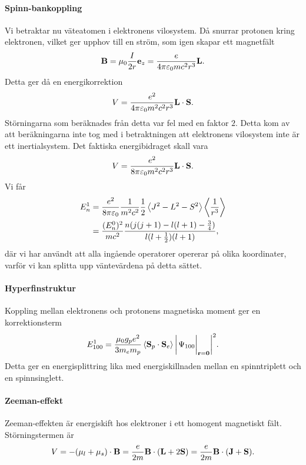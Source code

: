 \paragraph{Spinn-bankoppling}
Vi betraktar nu väteatomen i elektronens vilosystem. Då snurrar protonen kring elektronen, vilket ger upphov till en ström, som igen skapar ett magnetfält
\begin{align*}
	\vb{B} = \mu_{0}\frac{I}{2r}\vb{e}_{z} = \frac{e}{4\pi\varepsilon_{0}mc^{2}r^{3}}\vb{L}.
\end{align*}
Detta ger då en energikorrektion
\begin{align*}
	V = \frac{e^{2}}{4\pi\varepsilon_{0}m^{2}c^{2}r^{3}}\vb{L}\cdot\vb{S}.
\end{align*}
Störningarna som beräknades från detta var fel med en faktor $2$. Detta kom av att beräkningarna inte tog med i betraktningen att elektronens vilosystem inte är ett inertialsystem. Det faktiska energibidraget skall vara
\begin{align*}
	V = \frac{e^{2}}{8\pi\varepsilon_{0}m^{2}c^{2}r^{3}}\vb{L}\cdot\vb{S}.
\end{align*}
Vi får
\begin{align*}
	E_{n}^{1} &= \frac{e ^{2}}{8\pi\varepsilon_{0}}\frac{1}{m^{2}c^{2}}\frac{1}{2}\expval{J^{2} - L^{2} - S^{2}}\expval{\frac{1}{r^{3}}} \\
	          &= \frac{(E_{n}^{0})^{2}}{mc^{2}}\frac{n(j(j + 1) - l(l + 1) - \frac{3}{4})}{l(l + \frac{1}{2})(l + 1)},
\end{align*}
där vi har användt att alla ingående operatorer opererar på olika koordinater, varför vi kan splitta upp väntevärdena på detta sättet.

\paragraph{Hyperfinstruktur}
Koppling mellan elektronens och protonens magnetiska moment ger en korrektionsterm
\begin{align*}
	E_{100}^{1} = \frac{\mu_{0}g_{p}e^{2}}{3m_{e}m_{p}}\expval{\vb{S}_{p}\cdot\vb{S}_{e}}\abs{\eval{\Psi_{100}}_{\vb{r} = \vb{0}}}^{2}.
\end{align*}
Detta ger en energisplittring lika med energiskillnaden mellan en spinntriplett och en spinnsinglett.

\paragraph{Zeeman-effekt}
Zeeman-effekten är energiskift hos elektroner i ett homogent magnetiskt fält. Störningstermen är
\begin{align*}
	V = -(\vb{\mu}_{l} + \vb{\mu}_{s})\cdot\vb{B} = \frac{e}{2m}\vb{B}\cdot(\vb{L} + 2\vb{S}) = \frac{e}{2m}\vb{B}\cdot(\vb{J} + \vb{S}).
\end{align*}

